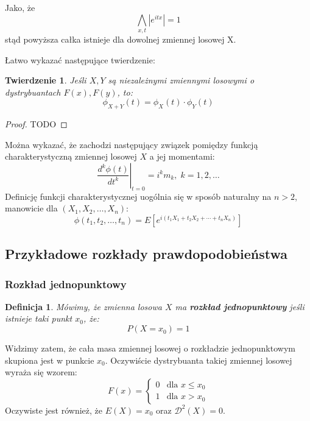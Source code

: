 \documentclass[10pt,a4paper]{article}
\newtheorem{definition}{Definicja}[section]
\newtheorem{theorem}{Twierdzenie}[section]
\numberwithin{equation}{subsection}
\begin{document}
Jako, że
\[
  \bigwedge_{x,t}|e^{itx}| = 1
\]
stąd powyższa całka istnieje dla dowolnej zmiennej losowej X.

Łatwo wykazać następujące twierdzenie:

\begin{theorem}
  Jeśli $X, Y$ są niezależnymi zmiennymi losowymi o dystrybuantach $F(x), F(y)$,
  to:
  \begin{equation}
  \phi_{X+Y}(t) = \phi_X(t)\cdot\phi_Y(t)
  \end{equation}
\end{theorem}

\begin{proof}
  TODO
\end{proof}

Można wykazać, że zachodzi następujący związek pomiędzy funkcją
charakterystyczną zmiennej losowej $X$ a jej momentami:
\begin{equation}
  \left.\frac{d^k\phi(t)}{dt^k}\right|_{t=0}=i^km_k,\;k=1,2,\dotsc
\end{equation}
Definicję funkcji charakterystycznej uogólnia się w sposób naturalny na $n>2$,
manowicie dla $(X_1, X_2, \dotsc, X_n)$:
\begin{equation}
  \phi(t_1,t_2, \dotsc, t_n) = E[e^{i(t_1X_1+t_2X_2+\dotsb+t_nX_n)}]
\end{equation}


\subsection{Przykładowe rozkłady prawdopodobieństwa}
\subsubsection{Rozkład jednopunktowy}
\begin{definition}
  Mówimy, że zmienna losowa $X$ ma \textbf{rozkład jednopunktowy} jeśli istnieje
  taki punkt $x_0$, że:
  \begin{equation}
    P(X=x_0) = 1
  \end{equation}
\end{definition}
Widzimy zatem, że cała masa zmiennej losowej o rozkładzie jednopunktowym
skupiona jest w punkcie $x_0$. Oczywiście dystrybuanta takiej zmiennej losowej
wyraża się wzorem:
\begin{equation}
  F(x) = \begin{cases}
    0 & \text{dla } x \leq x_0 \\
    1 & \text{dla } x > x_0
  \end{cases}
\end{equation}
Oczywiste jest również, że $E(X)=x_0$ oraz $\mathscr{D}^2(X)=0$.
\end{document}
